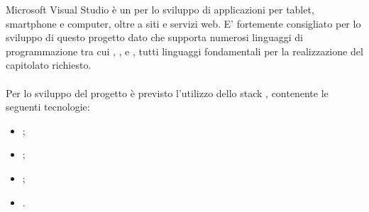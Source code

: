 Microsoft Visual Studio è un  per lo sviluppo di applicazioni per tablet, smartphone e computer, oltre a siti e servizi web. E' fortemente consigliato per lo sviluppo di questo progetto dato che supporta numerosi linguaggi di programmazione tra cui , ,  e , tutti linguaggi fondamentali per la realizzazione del capitolato richiesto.

\paragraph{}
Per lo sviluppo del progetto è previsto l'utilizzo dello stack , contenente le seguenti tecnologie:
\begin{itemize}
\item {};
\item {};
\item {};
\item {}.
\end{itemize}